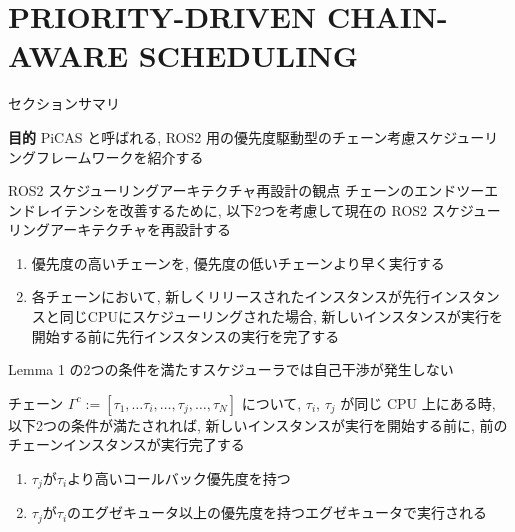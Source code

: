 
\section{PRIORITY-DRIVEN CHAIN-AWARE SCHEDULING}
\label{sec: priority-driven chain-aware scheduling}

\begin{frame}{セクションサマリ}
    \begin{itembox}[l]{\textbf{目的}}
        PiCAS と呼ばれる, ROS2 用の優先度駆動型のチェーン考慮スケジューリングフレームワークを紹介する
    \end{itembox}
\end{frame}

\begin{frame}{ROS2 スケジューリングアーキテクチャ再設計の観点}
    チェーンのエンドツーエンドレイテンシを改善するために, 以下2つを考慮して現在の ROS2 スケジューリングアーキテクチャを再設計する
    \begin{enumerate}
        \item 優先度の高いチェーンを, 優先度の低いチェーンより早く実行する
        \item 各チェーンにおいて, 新しくリリースされたインスタンスが先行インスタンスと同じCPUにスケジューリングされた場合, 新しいインスタンスが実行を開始する前に先行インスタンスの実行を完了する
    \end{enumerate}
\end{frame}

\begin{frame}[label=lemma1]{Lemma 1}
     の2つの条件を満たすスケジューラでは自己干渉が発生しない
    \begin{lemma}[]
        チェーン $\Gamma^{c}:=\left[\tau_{1}, \ldots \tau_{i}, \ldots, \tau_{j}, \ldots, \tau_{N}\right]$ について, $\tau_{i}$, $\tau_{j}$ が同じ CPU 上にある時, 以下2つの条件が満たされれば, 新しいインスタンスが実行を開始する前に, 前のチェーンインスタンスが実行完了する
        \begin{enumerate}
            \item $\tau_{j}$が$\tau_{i}$より高いコールバック優先度を持つ
            \item $\tau_{j}$が$\tau_{i}$のエグゼキュータ以上の優先度を持つエグゼキュータで実行される
        \end{enumerate}
    \end{lemma}
\end{frame}

